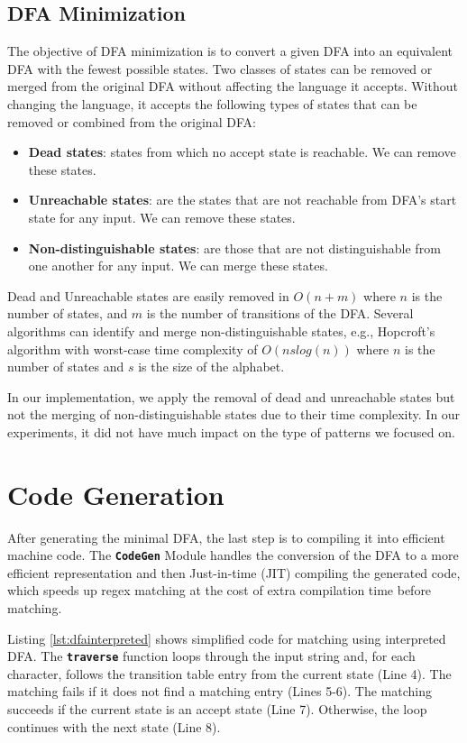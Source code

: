 \subsection{DFA Minimization}\label{dfamin}
The objective of DFA minimization is to convert a given DFA into an equivalent DFA with the fewest possible states. Two classes of states can be removed or merged from the original DFA without affecting the language it accepts. Without changing the language, it accepts the following types of states that can be removed or combined from the original DFA:

\begin{itemize}
    \item \textbf{Dead states}: states from which no accept state is reachable. We can remove these states.
    \item  \textbf{Unreachable states}: are the states that are not reachable from DFA's start state for any input. We can remove these states.
    \item \textbf{Non-distinguishable states}: are those that are not distinguishable from one another for any input. We can merge these states.
\end{itemize}

Dead and Unreachable states are easily removed in $O(n + m)$ where $n$ is the number of states, and $m$ is the number of transitions of the DFA. Several algorithms can identify and merge non-distinguishable states, e.g., Hopcroft's algorithm \cite{Hopcroftalgo} with worst-case time complexity of $O(ns log(n))$ where $n$ is the number of states and $s$ is the size of the alphabet.

In our implementation, we apply the removal of dead and unreachable states but not the merging of non-distinguishable states due to their time complexity. In our experiments, it did not have much impact on the type of patterns we focused on.

\section{Code Generation}
After generating the minimal DFA, the last step is to compiling it into efficient machine code. The \texttt{\textbf{CodeGen}} Module handles the conversion of the DFA to a more efficient representation and then Just-in-time (JIT) compiling the generated code, which speeds up regex matching at the cost of extra compilation time before matching.

Listing \ref{lst:dfainterpreted} shows simplified code for matching using interpreted DFA. The \texttt{\textbf{traverse}} function loops through the input string and, for each character, follows the transition table entry from the current state (Line 4). The matching fails if it does not find a matching entry (Lines 5-6). The matching succeeds if the current state is an accept state (Line 7). Otherwise, the loop continues with the next state (Line 8). 


